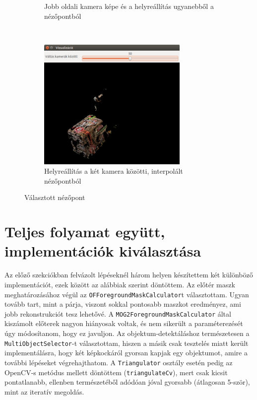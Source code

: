 \begin{figure}[tbh]
\begin{subfigure}[b]{.43\linewidth}
	\caption{Jobb oldali kamera képe és a helyre\-ál\-lí\-tás ugyanebből a nézőpontból}
  \end{subfigure}\\\vspace{15pt}
\begin{subfigure}[b]{.60\linewidth}
	\centering
	\includegraphics[width=205pt]{figures/visu_pixels_center.png}
	\caption{Helyreállítás a két kamera közötti, interpolált nézőpontból}
  \end{subfigure}
\caption{Választott nézőpont  \label{fig:visu_slider}}
\end{figure}

\section{Teljes folyamat együtt, implementációk kiválasztása}

Az előző szekciókban felvázolt lépéseknél három helyen készítettem két különböző implementációt, ezek között az alábbiak szerint döntöttem. Az előtér maszk meghatározásához végül az \texttt{OFForegroundMaskCalculator}t választottam. Ugyan tovább tart, mint a párja, viszont sokkal pontosabb maszkot eredményez, ami jobb rekonstrukciót tesz lehetővé. A \texttt{MOG2ForegroundMaskCalculator} által kiszámolt előterek nagyon hiányosak voltak, és nem sikerült a paraméterezését úgy módosítanom, hogy ez javuljon. Az objektum-detektáláshoz természetesen a \texttt{MultiObjectSelector}-t választottam, hiszen a másik csak tesztelés miatt került implementálásra, hogy két képkockáról gyorsan kapjak egy objektumot, amire a további lépéseket végrehajthatom. A \texttt{Triangulator} osztály esetén pedig az OpenCV-s metódus mellett döntöttem (\texttt{triangulateCv}), mert csak kicsit pontatlanabb, ellenben természetéből adódóan jóval gyorsabb (átlagosan 5-ször), mint az iteratív megoldás.

